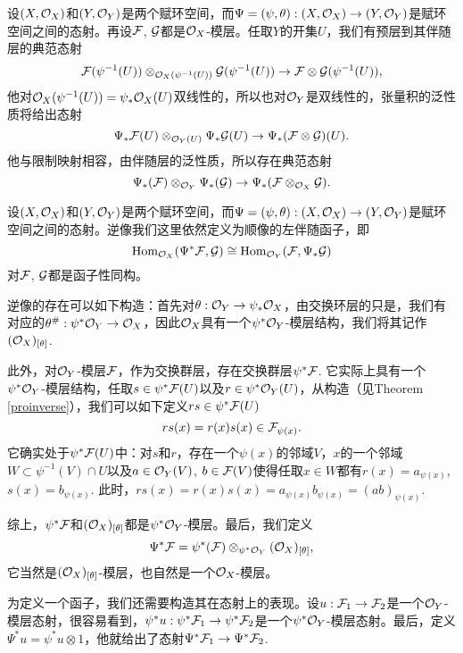 \begin{para}[张量积的顺像]
设$(X,\mathcal{O}_X)$和$(Y,\mathcal{O}_Y)$是两个赋环空间，而$\Psi=(\psi,\theta):(X,\mathcal{O}_X)\to (Y,\mathcal{O}_Y)$是赋环空间之间的态射。再设$\mathcal{F}$, $\mathcal{G}$都是$\mathcal{O}_X$-模层。任取$Y$的开集$U$，我们有预层到其伴随层的典范态射
\[
	\mathcal{F}(\psi^{-1}(U))\otimes_{\mathcal{O}_X(\psi^{-1}(U))} \mathcal{G}(\psi^{-1}(U))\to \mathcal{F}\otimes \mathcal{G}(\psi^{-1}(U)),
\]
他对$\mathcal{O}_X(\psi^{-1}(U))=\psi_*\mathcal{O}_X(U)$双线性的，所以也对$\mathcal{O}_Y$是双线性的，张量积的泛性质将给出态射
\[
	\Psi_*\mathcal{F} (U)\otimes_{\mathcal{O}_Y(U)}\Psi_*\mathcal{G} (U)\to \Psi_*(\mathcal{F}\otimes \mathcal{G}) (U).
\]
他与限制映射相容，由伴随层的泛性质，所以存在典范态射
\[
	\Psi_*(\mathcal{F})\otimes_{\mathcal{O}_Y}\Psi_*(\mathcal{G}) \to \Psi_*(\mathcal{F}\otimes_{\mathcal{O}_X} \mathcal{G}).
\]
\end{para}

\begin{para}[逆像]
设$(X,\mathcal{O}_X)$和$(Y,\mathcal{O}_Y)$是两个赋环空间，而$\Psi=(\psi,\theta):(X,\mathcal{O}_X)\to (Y,\mathcal{O}_Y)$是赋环空间之间的态射。逆像我们这里依然定义为顺像的左伴随函子，即
\[
	\operatorname{Hom}_{\mathcal{O}_X}(\Psi^*\mathcal{F},\mathcal{G})\cong \operatorname{Hom}_{\mathcal{O}_Y}(\mathcal{F},\Psi_*\mathcal{G})
\]
对$\mathcal{F}$, $\mathcal{G}$都是函子性同构。

逆像的存在可以如下构造：首先对$\theta:\mathcal{O}_Y\to \psi_*\mathcal{O}_X$，由交换环层的只是，我们有对应的$\theta^\#:\psi^*\mathcal{O}_Y\to \mathcal{O}_X$，因此$\mathcal{O}_X$具有一个$\psi^*\mathcal{O}_Y$-模层结构，我们将其记作$(\mathcal{O}_X)_{[\theta]}$.

此外，对$\mathcal{O}_Y$-模层$\mathcal{F}$，作为交换群层，存在交换群层$\psi^*\mathcal{F}$. 它实际上具有一个$\psi^*\mathcal{O}_Y$-模层结构，任取$s\in \psi^*\mathcal{F}(U)$以及$r\in \psi^*\mathcal{O}_Y(U)$，从构造（见Theorem \ref{proinverse}），我们可以如下定义$rs\in \psi^*\mathcal{F}(U)$
\[
	rs(x)=r(x)s(x)\in \mathcal{F}_{\psi(x)}.
\]
它确实处于$\psi^*\mathcal{F}(U)$中：对$s$和$r$，存在一个$\psi(x)$的邻域$V$，$x$的一个邻域$W\subset \psi^{-1}(V)\cap U$以及$a\in \mathcal{O}_Y(V)$, $b\in \mathcal{F}(V)$使得任取$x\in W$都有$r(x)=a_{\psi(x)}$, $s(x)=b_{\psi(x)}$. 此时，$rs(x)=r(x)s(x)=a_{\psi(x)}b_{\psi(x)}=(ab)_{\psi(x)}$.

综上，$\psi^*\mathcal{F}$和$(\mathcal{O}_X)_{[\theta]}$都是$\psi^*\mathcal{O}_Y$-模层。最后，我们定义
\[
	\Psi^*\mathcal{F}=\psi^*(\mathcal{F})\otimes_{\psi^*\mathcal{O}_Y} (\mathcal{O}_X)_{[\theta]},
\]
它当然是$(\mathcal{O}_X)_{[\theta]}$-模层，也自然是一个$\mathcal{O}_X$-模层。

为定义一个函子，我们还需要构造其在态射上的表现。设$u:\mathcal{F}_1\to\mathcal{F}_2$是一个$\mathcal{O}_Y$-模层态射，很容易看到，$\psi^*u :\psi^*\mathcal{F}_1\to\psi^*\mathcal{F}_2$是一个$\psi^*\mathcal{O}_Y$-模层态射。最后，定义$\Psi^*u=\psi^*u\otimes 1$，他就给出了态射$\Psi^*\mathcal{F}_1\to \Psi^*\mathcal{F}_2$.
\end{para}

